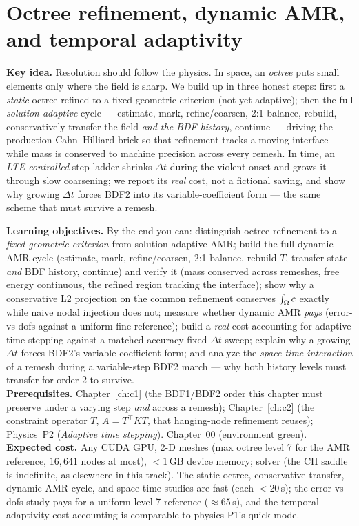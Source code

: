 \chapter{Octree refinement, dynamic AMR, and temporal adaptivity}
\label{ch:c3}
\begin{keybox}
\textbf{Key idea.} Resolution should follow the physics. In space, an
\emph{octree} puts small elements only where the field is sharp. We build
up in three honest steps: first a \emph{static} octree refined to a fixed
geometric criterion (not yet adaptive); then the full
\emph{solution-adaptive} cycle --- estimate, mark, refine/coarsen, 2:1
balance, rebuild, conservatively transfer the field \emph{and the BDF
history}, continue --- driving the production Cahn--Hilliard brick so that
refinement tracks a moving interface while mass is conserved to machine
precision across every remesh. In time, an \emph{LTE-controlled} step
ladder shrinks $\Delta t$ during the violent onset and grows it through
slow coarsening; we report its \emph{real} cost, not a fictional saving,
and show why growing $\Delta t$ forces BDF2 into its variable-coefficient
form --- the same scheme that must survive a remesh.
\end{keybox}

\begin{keybox}
\textbf{Learning objectives.} By the end you can: distinguish octree
refinement to a \emph{fixed geometric criterion} from solution-adaptive
AMR; build the full dynamic-AMR cycle (estimate, mark, refine/coarsen, 2:1
balance, rebuild $T$, transfer state \emph{and} BDF history, continue) and
verify it (mass conserved across remeshes, free energy continuous, the
refined region tracking the interface); show why a conservative L2
projection on the common refinement conserves $\int_\Omega c$ exactly while naive
nodal injection does not; measure whether dynamic AMR \emph{pays}
(error-vs-dofs against a uniform-fine reference); build a \emph{real} cost
accounting for adaptive time-stepping against a matched-accuracy
fixed-$\Delta t$ sweep; explain why a growing $\Delta t$ forces BDF2's
variable-coefficient form; and analyze the \emph{space-time interaction} of
a remesh during a variable-step BDF2 march --- why both history levels must
transfer for order 2 to survive.\\[2pt]
\textbf{Prerequisites.} Chapter~\ref{ch:c1} (the BDF1/BDF2 order this
chapter must preserve under a varying step \emph{and} across a remesh);
Chapter~\ref{ch:c2} (the constraint operator $T$, $A=T^{\!\top}KT$, that
hanging-node refinement reuses); Physics~P2 (\emph{Adaptive time stepping}).
Chapter~00 (environment green).\\[2pt]
\textbf{Expected cost.} Any CUDA GPU, 2-D meshes (max octree level 7 for the
AMR reference, $16{,}641$ nodes at most), $<1$\,GB device memory; solver
 (the CH saddle is indefinite, as elsewhere in this track). The
static octree, conservative-transfer, dynamic-AMR cycle, and space-time
studies are fast (each $<20$\,s); the error-vs-dofs study pays for a
uniform-level-7 reference ($\approx65$\,s), and the temporal-adaptivity
cost accounting is comparable to physics P1's quick mode.
\end{keybox}

